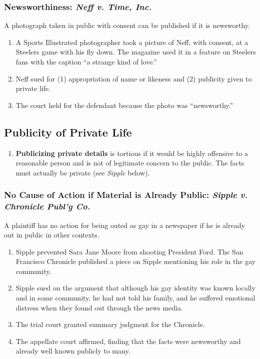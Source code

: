 \subsubsection{Newsworthiness: \emph{Neff v. Time, Inc.}}

A photograph taken in public with consent can be published if it is 
newsworthy.

\begin{enumerate}
    \item A Sports Illustrated photographer took a picture of Neff, with 
    consent, at a Steelers game with his fly down. The magazine used it in a 
    feature on Steelers fans with the caption ``a strange kind of love.''
    \item Neff sued for (1) appropriation of name or likeness and (2) 
    publicity given to private life. 
    \item The court held for the defendant because the photo was 
    ``newsworthy.''
\end{enumerate}

\subsection{Publicity of Private Life}

\begin{enumerate}
    \item \textbf{Publicizing private details} is tortious if it would be highly 
    offensive to a reasonable person and is not of legitimate concern to the 
    public. The facts must actually be private (see \emph{Sipple} below).
\end{enumerate}

\subsubsection{No Cause of Action if Material is Already Public: \emph{Sipple 
v. Chronicle Publ'g Co.}}

A plaintiff has no action for being outed as gay in a newspaper if he is 
already out in public in other contexts.

\begin{enumerate}
    \item Sipple prevented Sara Jane Moore from shooting President Ford. The 
    San Francisco Chronicle published a piece on Sipple mentioning his role in 
    the gay community.
    \item Sipple sued on the argument that although his gay identity was known 
    locally and in some community, he had not told his family, and he suffered 
    emotional distress when they found out through the news media.
    \item The trial court granted summary judgment for the Chronicle.
    \item The appellate court affirmed, finding that the facts were newsworthy 
    and already well known publicly to many.
\end{enumerate}

